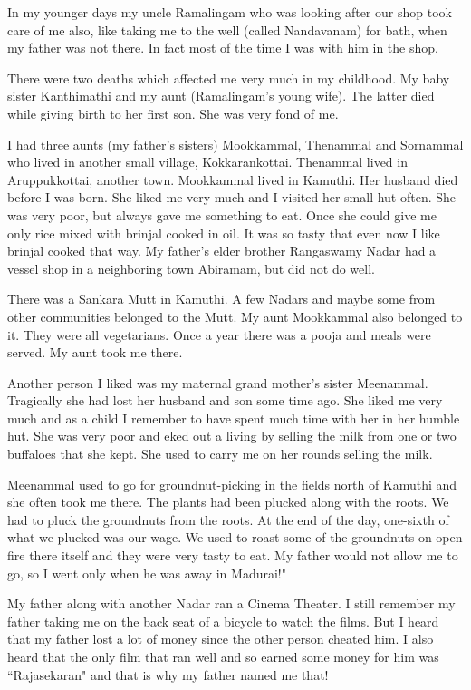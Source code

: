 In my younger days my uncle Ramalingam who was looking after our shop 
took care of me also, like taking me to the well (called Nandavanam) for 
bath, when my father was not there. In fact most of the time I was with 
him in the shop.

There were two deaths which affected me very much in my childhood. My 
baby sister Kanthimathi and my aunt (Ramalingam's young wife). The 
latter died while giving birth to her first son. She was very fond of 
me.

I had three aunts (my father's sisters) Mookkammal, Thenammal and 
Sornammal who lived in another small village, Kokkarankottai. Thenammal 
lived in Aruppukkottai, another town. Mookkammal lived in Kamuthi. Her 
husband died before I was born. She liked me very much and I visited her 
small hut often. She was very poor, but always gave me something to eat. 
Once she could give me only rice mixed with brinjal cooked in oil. It 
was so tasty that even now I like brinjal cooked that way. My father's 
elder brother Rangaswamy Nadar had a vessel shop in a neighboring town 
Abiramam, but did not do well.

There was a Sankara Mutt in Kamuthi. A few Nadars and maybe some from 
other communities belonged to the Mutt. My aunt Mookkammal also belonged 
to it. They were all vegetarians. Once a year there was a pooja and 
meals were served. My aunt took me there.

Another person I liked was my maternal grand mother's sister Meenammal. 
Tragically she had lost her husband and son some time ago. She liked me 
very much and as a child I remember to have spent much time with her in 
her humble hut. She was very poor and eked out a living by selling the 
milk from one or two buffaloes that she kept. She used to carry me on 
her rounds selling the milk.

Meenammal used to go for groundnut-picking in the fields north of 
Kamuthi and she often took me there. The plants had been plucked along 
with the roots. We had to pluck the groundnuts from the roots. At the 
end of the day, one-sixth of what we plucked was our wage. We used to 
roast some of the groundnuts on open fire there itself and they were 
very tasty to eat. My father would not allow me to go, so I went only 
when he was away in Madurai!"

My father along with another Nadar ran a Cinema Theater. I still 
remember my father taking me on the back seat of a bicycle to watch the 
films. But I heard that my father lost a lot of money since the other 
person cheated him. I also heard that the only film that ran well and so 
earned some money for him was ``Rajasekaran" and that is why my father 
named me that!

